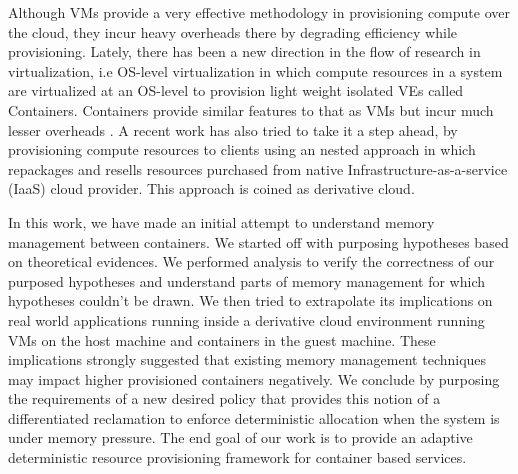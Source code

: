 \documentclass[11pt,a4paper,openright]{report}
\begin{document}
    Although VMs provide a very effective methodology in provisioning compute over the cloud, they incur heavy overheads there by degrading 
efficiency while provisioning. Lately, there has been a new direction in the flow of research in virtualization, i.e OS-level virtualization 
in which compute resources in a system are virtualized at an OS-level to provision light weight isolated VEs called Containers. Containers 
provide similar features to that as VMs but incur much lesser overheads \cite{felter2015updated} \cite{morabito2015hypervisors} . A recent 
work \cite{sharma2015spotcheck} has also tried to take it a step ahead, by provisioning compute resources to clients using an nested 
approach in which repackages and resells resources purchased from native Infrastructure-as-a-service (IaaS) cloud provider. This approach is 
coined as derivative cloud.

    In this work, we have made an initial attempt to understand memory management between containers. We started off with purposing 
hypotheses based on theoretical evidences. We performed analysis to verify the correctness of our purposed hypotheses and understand parts 
of memory management for which hypotheses couldn't be drawn. We then tried to extrapolate its implications on real world applications 
running inside a derivative cloud environment running VMs on the host machine and containers in the guest machine. These implications 
strongly suggested that existing memory management techniques may impact higher provisioned containers negatively. We conclude by purposing 
the requirements of a new desired policy that provides this notion of a differentiated reclamation to enforce deterministic allocation when 
the system is under memory pressure. The end goal of our work is to provide an adaptive deterministic resource provisioning framework for 
container based services. 

    
  \tableofcontents
  \listoftables
  \listoffigures
  \cleardoublepage
  \setcounter{page}{1}
  \setlength{\parskip}{1em}
  
    
   
  
  
  
  
  
  
  
    
  
\end{document}
